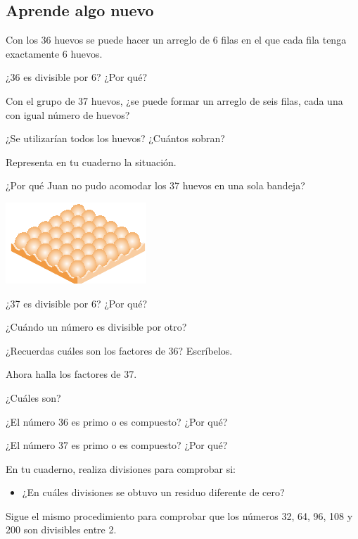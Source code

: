 \documentclass[10pt,twoside]{article}
\begin{document}
\subsection*{Aprende algo nuevo}
Con los 36 huevos se puede hacer un arreglo de 6 filas en el que cada fila tenga exactamente 6 huevos.
\begin{itemize}
\begin{minipage}{.55\textwidth}
\item  ¿36 es divisible por 6? ¿Por qué?
 \item  Con el grupo de 37 huevos, ¿se puede formar un arreglo
de seis filas, cada una con igual número de huevos?
 \item ¿Se utilizarían todos los huevos? ¿Cuántos sobran?
 \item Representa en tu cuaderno la situación.
 \item  ¿Por qué Juan no pudo acomodar los 37 huevos en una sola bandeja?
\end{minipage}\hfill
\begin{minipage}{.35\textwidth}
 \begin{center}
 \includegraphics{./Images/huevos_01.png}
\end{center}
\end{minipage}
\item ¿37 es divisible por 6? ¿Por qué?
\item ¿Cuándo un número es divisible por otro?
\item ¿Recuerdas cuáles son los factores de 36? Escríbelos.
\item Ahora halla los factores de 37.
\item ¿Cuáles son?
\item ¿El número 36 es primo o es compuesto? ¿Por qué?
\item ¿El número 37 es primo o es compuesto? ¿Por qué?
\end{itemize}
En tu cuaderno, realiza divisiones para comprobar si:
\begin{itemize}
 \item ¿En cuáles divisiones se obtuvo un residuo diferente de cero?
\end{itemize}
Sigue el mismo procedimiento para comprobar que los números 32, 64, 96, 108 y 200 son divisibles entre 2.
\end{document}
